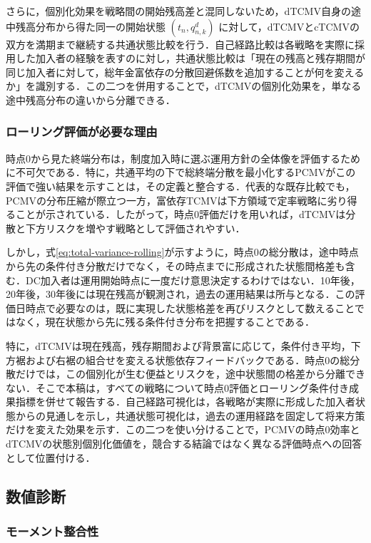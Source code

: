 \documentclass[10pt,a4paper]{article}
\theoremstyle{plain}
\theoremstyle{definition}
\begin{document}
さらに，個別化効果を戦略間の開始残高差と混同しないため，dTCMV自身の途中残高分布から得た同一の開始状態 $(t_n,q_{n,k}^{d})$ に対して，dTCMVとcTCMVの双方を満期まで継続する共通状態比較を行う．自己経路比較は各戦略を実際に採用した加入者の経験を表すのに対し，共通状態比較は「現在の残高と残存期間が同じ加入者に対して，総年金富依存の分散回避係数を追加することが何を変えるか」を識別する．この二つを併用することで，dTCMVの個別化効果を，単なる途中残高分布の違いから分離できる．

\subsubsection{ローリング評価が必要な理由}

時点0から見た終端分布は，制度加入時に選ぶ運用方針の全体像を評価するために不可欠である．特に，共通平均の下で総終端分散を最小化するPCMVがこの評価で強い結果を示すことは，その定義と整合する．代表的な既存比較でも，PCMVの分布圧縮が際立つ一方，富依存TCMVは下方領域で定率戦略に劣り得ることが示されている\citep{vanStadenDangForsyth2021}．したがって，時点0評価だけを用いれば，dTCMVは分散と下方リスクを増やす戦略として評価されやすい．

しかし，式\eqref{eq:total-variance-rolling}が示すように，時点0の総分散は，途中時点から先の条件付き分散だけでなく，その時点までに形成された状態間格差も含む．DC加入者は運用開始時点に一度だけ意思決定するわけではない．10年後，20年後，30年後には現在残高が観測され，過去の運用結果は所与となる．この評価日時点で必要なのは，既に実現した状態格差を再びリスクとして数えることではなく，現在状態から先に残る条件付き分布を把握することである．

特に，dTCMVは現在残高，残存期間および背景富に応じて，条件付き平均，下方裾および右裾の組合せを変える状態依存フィードバックである．時点0の総分散だけでは，この個別化が生む便益とリスクを，途中状態間の格差から分離できない．そこで本稿は，すべての戦略について時点0評価とローリング条件付き成果指標を併せて報告する．自己経路可視化は，各戦略が実際に形成した加入者状態からの見通しを示し，共通状態可視化は，過去の運用経路を固定して将来方策だけを変えた効果を示す．この二つを使い分けることで，PCMVの時点0効率とdTCMVの状態別個別化価値を，競合する結論ではなく異なる評価時点への回答として位置付ける．

\subsection{数値診断}
\label{sec:diagnostics}

\subsubsection{モーメント整合性}
\end{document}
